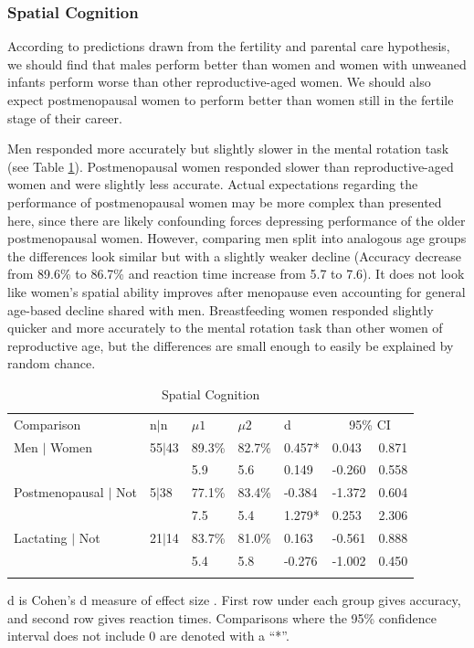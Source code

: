 		\subsubsection{Spatial Cognition}		
		\label{sec:3.1.1}
		
According to predictions drawn from the fertility and parental care hypothesis, we should find that males perform better than women and women with unweaned infants perform worse than other reproductive-aged women.  We should also expect postmenopausal women to perform better than women still in the fertile stage of their career.

Men responded more accurately but slightly slower in the mental rotation task (see Table \ref{tab:cog}).  Postmenopausal women responded slower than reproductive-aged women and were slightly less accurate.  Actual expectations regarding the performance of postmenopausal women may be more complex than presented here, since there are likely confounding forces depressing performance of the older postmenopausal women.  However, comparing men split into analogous age groups the differences look similar but with a slightly weaker decline (Accuracy decrease from 89.6\% to 86.7\% and reaction time increase from 5.7 to 7.6).  It does not look like women's spatial ability improves after menopause even accounting for general age-based decline shared with men.  Breastfeeding women responded slightly quicker and more accurately to the mental rotation task than other women of reproductive age, but the differences are small enough to easily be explained by random chance.

\begin{table}[h!]
\caption{Spatial Cognition}
\label{tab:cog}  
\begin{tabular}{lllllll}
\hline\noalign{\smallskip}
Comparison & \phantom{0}n$|$n & $\mu1$ & $\mu2$ & d & \multicolumn{2}{c}{95\% CI} \\
\noalign{\smallskip}\hline\noalign{\smallskip}
Men $|$ Women & 55$|$43 & 89.3\% & 82.7\% & \phantom{-}0.457* & \phantom{-}0.043 & \phantom{-}0.871 \\
& & 5.9 & 5.6 & \phantom{-}0.149 & -0.260 & \phantom{-}0.558 \\
Postmenopausal $|$ Not & \phantom{0}5$|$38 & 77.1\% & 83.4\% & -0.384 & -1.372 & \phantom{-}0.604 \\
& & 7.5 & 5.4 & \phantom{-}1.279* & \phantom{-}0.253 & \phantom{-}2.306 \\
Lactating $|$ Not & 21$|$14 & 83.7\% & 81.0\% & \phantom{-}0.163 & -0.561 & \phantom{-}0.888 \\
& & 5.4 & 5.8 & -0.276 & -1.002 & \phantom{-}0.450 \\
\noalign{\smallskip}\hline
\end{tabular}\par
\bigskip
d is Cohen's d measure of effect size \cite{cohen1988statistical}. First row under each group gives accuracy, and second row gives reaction times.  Comparisons where the 95\% confidence interval does not include 0 are denoted with a ``*''.
\end{table}		  

